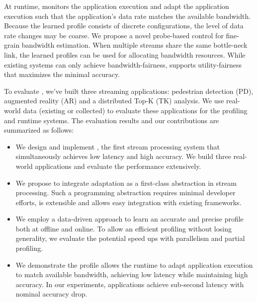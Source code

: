 At runtime, \sysname{} monitors the application execution and adapt the
application execution such that the application's data rate matches the
available bandwidth. Because the learned profile consists of discrete
configurations, the level of data rate changes may be coarse. We propose a novel
probe-based control for fine-grain bandwidth estimation. When multiple streams
share the same bottle-neck link, the learned profiles can be used for allocating
bandwidth resources. While existing systems can only achieve bandwidth-fairness,
\sysname{} supports utility-fairness that maximizes the minimal accuracy.

To evaluate \sysname{}, we've built three streaming applications: pedestrian
detection (PD), augmented reality (AR) and a distributed Top-K (TK) analysis. We
use real-world data (existing or collected) to evaluate these applications for
the profiling and runtime systems. The evaluation results and our contributions
are summarized as follows:

\begin{itemize}[leftmargin=16pt]
\item We design and implement \sysname{}, the first stream processing system
  that simultaneously achieves low latency and high accuracy. We build three
  real-world applications and evaluate the performance extensively.
\item We propose to integrate adaptation as a first-class abstraction in stream
  processing. Such a programming abstraction requires minimal developer efforts,
  is extensible and allows easy integration with existing frameworks.
\item We employ a data-driven approach to learn an accurate and precise profile
  both at offline and online. To allow an efficient profiling without losing
  generality, we evaluate the potential speed ups with parallelism and partial
  profiling.
\item We demonstrate the profile allows the runtime to adapt application
  execution to match available bandwidth, achieving low latency while
  maintaining high accuracy. In our experiments, \sysname{} applications achieve
  sub-second latency with nominal accuracy drop.
\end{itemize}


